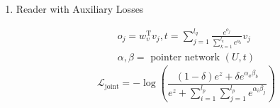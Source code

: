 \documentclass[a4paper,UTF8]{article}
\numberwithin{equation}{section}
\begin{document}
\begin{enumerate}
	\item Reader with Auxiliary Losses
	
\begin{equation}
\begin{array}{c}{o_{j}=w_{v}^{\mathrm{T}} v_{j}, t=\sum_{j=1}^{l_{q}} \frac{e^{o_{j}}}{\sum_{k=1}^{l_{q}} e^{o_{k}}} v_{j}} \\ {\alpha, \beta=\text { pointer network }(U, t)}\end{array}
\end{equation}
\begin{equation}
	\mathcal{L}_{\text {joint}}=-\log \left(\frac{(1-\delta) e^{z}+\delta e^{\alpha_{a} \beta_{b}}}{e^{z}+\sum_{i=1}^{l_{p}} \sum_{j=1}^{l_{p}} e^{\alpha_{i} \beta_{j}}}\right)
	\end{equation}


\end{enumerate}
\end{document}
